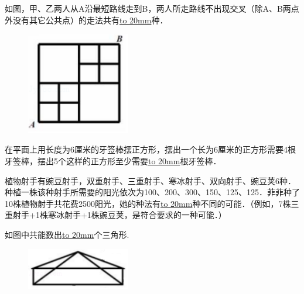 \item {
    如图，甲、乙两人从A沿最短路线走到B，两人所走路线不出现交叉（除A、B两点外没有其它公共点）的走法共有\underline{\hbox to 20mm{}}种．
    \begin{figure}[H] 
        \centering
        \includegraphics[width=0.4\textwidth]{./pics/Chapter_6/2016_4.png}
    \end{figure}
}

\item {
    在平面上用长度为6厘米的牙签棒摆正方形，摆出一个长为6厘米的正方形需要4根牙签棒，摆出5个这样的正方形至少需要\underline{\hbox to 20mm{}}根牙签棒．
}

\item {
    植物射手有豌豆射手，双重射手、三重射手、寒冰射手、双向射手、豌豆荚6种．种植一株该种射手所需要的阳光依次为100、200、300、150、125、125．菲菲种了10株植物射手共花费2500阳光，她的种法有\underline{\hbox to 20mm{}}种不同的可能．（例如，7株三重射手+1株寒冰射手+1株豌豆荚，是符合要求的一种可能．）
}

\item {
    如图中共能数出\underline{\hbox to 20mm{}}个三角形.
    \begin{figure}[H] 
        \centering
        \includegraphics[width=0.4\textwidth]{./pics/Chapter_6/2015_1.png}
    \end{figure}
}


